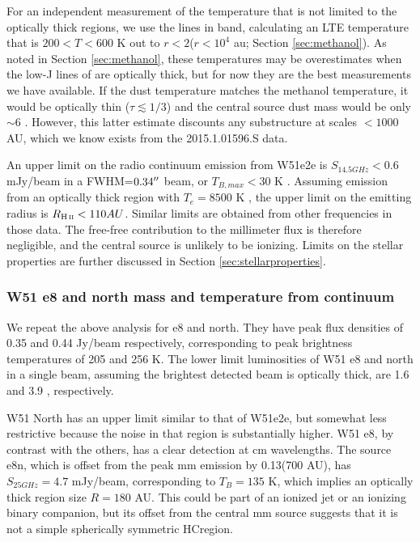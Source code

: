\documentclass{aa}
\begin{document}
For an independent measurement of the temperature that is not limited to the
optically thick regions, we use the \methanol lines in band, calculating an LTE
temperature that is $200 < T < 600$ K out to $r<2$\arcsec ($r<10^4$ au; Section
\ref{sec:methanol}).  As noted in Section \ref{sec:methanol}, these
temperatures may be overestimates when the low-J lines of \methanol are
optically thick, but for now they are the best measurements we have available.
If the dust temperature matches the methanol temperature, it would be optically
thin ($\tau \lesssim 1/3$) and the central source dust mass would be only
$\sim6$ \msun.  However, this latter estimate discounts any substructure at
scales $<1000$ AU, which we know exists from the 2015.1.01596.S data.

An upper limit on the radio continuum emission from W51e2e is $S_{14.5 GHz} <
0.6$ mJy/beam in a FWHM=$0.34\mbox{$^{\prime\prime}$}$ beam, or $T_{B,max} < 30$ K
\citep{Ginsburg2016b}.  Assuming emission from an optically thick \hii region
with $T_e = 8500$ K \citep{Ginsburg2015a}, the upper limit on the emitting
radius is $R_{\hii} < 110 AU$.  Similar limits are obtained from other
frequencies in those data.  The free-free contribution to the millimeter
flux is therefore negligible, and the central source is unlikely to be
ionizing.  Limits on the stellar properties are further discussed in
Section \ref{sec:stellarproperties}.


\subsubsection{W51 e8 and north mass and temperature from continuum}
\label{sec:w51e8andnorth}
We repeat the above analysis for e8 and north.  They have peak flux densities
of 0.35 and 0.44 Jy/beam respectively, corresponding to peak brightness
temperatures of 205 and 256 K.
The lower limit luminosities of W51 e8 and north in a single beam, assuming the
brightest detected beam is optically thick, are 1.6 and 3.9 \lsun,
respectively.


W51 North has an upper limit similar to that of W51e2e, but somewhat less
restrictive because the noise in that region is substantially higher.  W51 e8,
by contrast with the others, has a clear detection at cm wavelengths.  The
source e8n, which is offset from the peak mm emission by 0.13\arcsec (700 AU),
has $S_{25 GHz}=4.7$ mJy/beam, corresponding to $T_B=135$ K, which implies an
optically thick \hii region size $R=180$ AU.  This could be part of an ionized
jet or an ionizing binary companion, but its offset from the central mm source
suggests that it is not a simple spherically symmetric HC\hii region.
\end{document}
